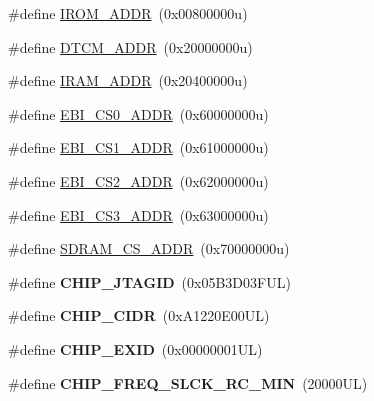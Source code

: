 \begin{DoxyCompactItemize}
\item 
\#define \mbox{\hyperlink{group__SAMV71N21__definitions_ga694212ffb8c2786bacee3d0ad6020bda}{I\+R\+O\+M\+\_\+\+A\+D\+DR}}~(0x00800000u)
\item 
\#define \mbox{\hyperlink{group__SAMV71N21__definitions_ga26626a425f7ebb3a0c2dbc276f0d9f78}{D\+T\+C\+M\+\_\+\+A\+D\+DR}}~(0x20000000u)
\item 
\#define \mbox{\hyperlink{group__SAMV71N21__definitions_gaae45ac2ef16942159481c767ac4805cf}{I\+R\+A\+M\+\_\+\+A\+D\+DR}}~(0x20400000u)
\item 
\#define \mbox{\hyperlink{group__SAMV71N21__definitions_ga9bcbb97ddae3b2cc5e2c9613d33f66b4}{E\+B\+I\+\_\+\+C\+S0\+\_\+\+A\+D\+DR}}~(0x60000000u)
\item 
\#define \mbox{\hyperlink{group__SAMV71N21__definitions_gaaddd9fdbbc77c9aced5308819f502a26}{E\+B\+I\+\_\+\+C\+S1\+\_\+\+A\+D\+DR}}~(0x61000000u)
\item 
\#define \mbox{\hyperlink{group__SAMV71N21__definitions_ga058a35f9991487dc2dd12ada792d0730}{E\+B\+I\+\_\+\+C\+S2\+\_\+\+A\+D\+DR}}~(0x62000000u)
\item 
\#define \mbox{\hyperlink{group__SAMV71N21__definitions_gad66ebdd0fc33ec3cf85dbaa14bbf05d9}{E\+B\+I\+\_\+\+C\+S3\+\_\+\+A\+D\+DR}}~(0x63000000u)
\item 
\#define \mbox{\hyperlink{group__SAMV71N21__definitions_ga61b7db25daf759c2a2beb6e5a0b57a84}{S\+D\+R\+A\+M\+\_\+\+C\+S\+\_\+\+A\+D\+DR}}~(0x70000000u)
\item 
\mbox{\label{group__SAMV71N21__definitions_gaa614519778eec0df55d3eeab3223e3f6}} 
\#define {\bfseries C\+H\+I\+P\+\_\+\+J\+T\+A\+G\+ID}~(0x05\+B3\+D03\+F\+U\+L)
\item 
\mbox{\label{group__SAMV71N21__definitions_ga1e1ae44dd9269a8a98c1d7e7a60e9fbd}} 
\#define {\bfseries C\+H\+I\+P\+\_\+\+C\+I\+DR}~(0x\+A1220\+E00\+U\+L)
\item 
\mbox{\label{group__SAMV71N21__definitions_ga35123717aa86b76bb6b73cf3adc4c2e6}} 
\#define {\bfseries C\+H\+I\+P\+\_\+\+E\+X\+ID}~(0x00000001\+U\+L)
\item 
\mbox{\label{group__SAMV71N21__definitions_ga0e868bf27426399dfdcb3a9dfc3733c4}} 
\#define {\bfseries C\+H\+I\+P\+\_\+\+F\+R\+E\+Q\+\_\+\+S\+L\+C\+K\+\_\+\+R\+C\+\_\+\+M\+IN}~(20000\+U\+L)

\end{DoxyCompactItemize}
